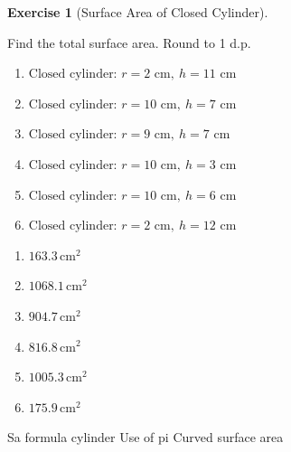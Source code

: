 \documentclass[
  letterpaper,
  DIV=11,
  numbers=noendperiod]{scrreprt}
\theoremstyle{definition}
\newtheorem{exercise}{Exercise}[chapter]
\theoremstyle{remark}
\begin{document}
\begin{exercise}[Surface Area of Closed
Cylinder]\protect\hypertarget{exr-sa-6}{}\label{exr-sa-6}

Find the total surface area. Round to 1 d.p.

\begin{enumerate}
\def\labelenumi{\alph{enumi})}
\item
  \(\text{Closed cylinder: }r=2\text{ cm},\ h=11\text{ cm}\)
\item
  \(\text{Closed cylinder: }r=10\text{ cm},\ h=7\text{ cm}\)
\item
  \(\text{Closed cylinder: }r=9\text{ cm},\ h=7\text{ cm}\)
\item
  \(\text{Closed cylinder: }r=10\text{ cm},\ h=3\text{ cm}\)
\item
  \(\text{Closed cylinder: }r=10\text{ cm},\ h=6\text{ cm}\)
\item
  \(\text{Closed cylinder: }r=2\text{ cm},\ h=12\text{ cm}\)
\end{enumerate}

\begin{tcolorbox}[enhanced jigsaw, opacitybacktitle=0.6, coltitle=black, arc=.35mm, colframe=quarto-callout-tip-color-frame, colback=white, bottomrule=.15mm, left=2mm, colbacktitle=quarto-callout-tip-color!10!white, titlerule=0mm, opacityback=0, title=\textcolor{quarto-callout-tip-color}{\faLightbulb}\hspace{0.5em}{🔍 View Solution}, leftrule=.75mm, breakable, rightrule=.15mm, bottomtitle=1mm, toptitle=1mm, toprule=.15mm]

\begin{enumerate}
\def\labelenumi{\alph{enumi})}
\item
  \(163.3\,\text{cm}^{2}\)
\item
  \(1068.1\,\text{cm}^{2}\)
\item
  \(904.7\,\text{cm}^{2}\)
\item
  \(816.8\,\text{cm}^{2}\)
\item
  \(1005.3\,\text{cm}^{2}\)
\item
  \(175.9\,\text{cm}^{2}\)
\end{enumerate}

\end{tcolorbox}

{Sa formula cylinder} {Use of pi} {Curved surface area}

\end{exercise}
\end{document}
